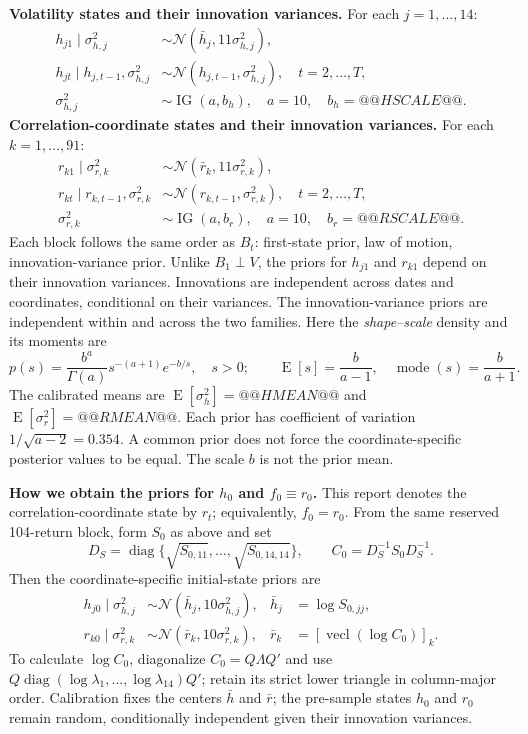 \documentclass[10pt,a4paper]{article}
\newcommand{\Normal}{\mathcal N}
\newcommand{\IG}{\operatorname{IG}}
\newcommand{\diag}{\operatorname{diag}}
\newcommand{\vecl}{\operatorname{vecl}}
\newcommand{\E}{\operatorname E}
\begin{document}
\textbf{Volatility states and their innovation variances.} For each $j=1,\ldots,14$:
\begin{align*}
h_{j1}\mid\sigma_{h,j}^2
&\sim\Normal(\bar h_j,11\sigma_{h,j}^2),\\
h_{jt}\mid h_{j,t-1},\sigma_{h,j}^2
&\sim\Normal(h_{j,t-1},\sigma_{h,j}^2),\quad t=2,\ldots,T,\\
\sigma_{h,j}^2&\sim\IG(a,b_h),\quad a=10,\quad b_h=@@HSCALE@@.
\end{align*}
\textbf{Correlation-coordinate states and their innovation variances.} For each $k=1,\ldots,91$:
\begin{align*}
r_{k1}\mid\sigma_{r,k}^2
&\sim\Normal(\bar r_k,11\sigma_{r,k}^2),\\
r_{kt}\mid r_{k,t-1},\sigma_{r,k}^2
&\sim\Normal(r_{k,t-1},\sigma_{r,k}^2),\quad t=2,\ldots,T,\\
\sigma_{r,k}^2&\sim\IG(a,b_r),\quad a=10,\quad b_r=@@RSCALE@@.
\end{align*}
Each block follows the same order as $B_t$: first-state prior, law of motion, innovation-variance prior.
Unlike $B_1\perp V$, the priors for $h_{j1}$ and $r_{k1}$ depend on their innovation variances.
Innovations are independent across dates and coordinates, conditional on their variances.
The innovation-variance priors are independent within and across the two families.
Here the \emph{shape--scale} density and its moments are
\[
p(s)=\frac{b^a}{\Gamma(a)}s^{-(a+1)}e^{-b/s},\quad s>0;\qquad
\E[s]=\frac b{a-1},\quad\operatorname{mode}(s)=\frac b{a+1}.
\]
The calibrated means are $\E[\sigma_h^2]=@@HMEAN@@$ and
$\E[\sigma_r^2]=@@RMEAN@@$. Each prior has coefficient of variation
$1/\sqrt{a-2}=0.354$. A common prior does not force the coordinate-specific posterior values
to be equal. The scale $b$ is not the prior mean.

\textbf{How we obtain the priors for $h_0$ and $f_0\equiv r_0$.}
This report denotes the correlation-coordinate state by $r_t$; equivalently, $f_0=r_0$.
From the same reserved 104-return block, form $S_0$ as above and set
\[
D_S=\diag\{\sqrt{S_{0,11}},\ldots,\sqrt{S_{0,14,14}}\},\qquad
C_0=D_S^{-1}S_0D_S^{-1}.
\]
Then the coordinate-specific initial-state priors are
\begin{align*}
h_{j0}\mid\sigma_{h,j}^2&\sim\Normal(\bar h_j,10\sigma_{h,j}^2),
&\bar h_j&=\log S_{0,jj},\\
r_{k0}\mid\sigma_{r,k}^2&\sim\Normal(\bar r_k,10\sigma_{r,k}^2),
&\bar r_k&=[\vecl(\log C_0)]_k.
\end{align*}
To calculate $\log C_0$, diagonalize $C_0=Q\Lambda Q'$ and use
$Q\diag(\log\lambda_1,\ldots,\log\lambda_{14})Q'$; retain its strict lower triangle
in column-major order. Calibration fixes the centers $\bar h$ and $\bar r$;
the pre-sample states $h_0$ and $r_0$ remain random, conditionally independent given
their innovation variances.
\end{document}
